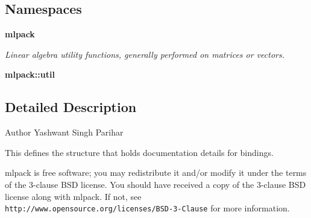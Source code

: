 \subsection*{Namespaces}
\begin{DoxyCompactItemize}
\item 
 \textbf{ mlpack}
\begin{DoxyCompactList}\small\item\em Linear algebra utility functions, generally performed on matrices or vectors. \end{DoxyCompactList}\item 
 \textbf{ mlpack\+::util}
\end{DoxyCompactItemize}


\subsection{Detailed Description}
\begin{DoxyAuthor}{Author}
Yashwant Singh Parihar
\end{DoxyAuthor}
This defines the structure that holds documentation details for bindings.

mlpack is free software; you may redistribute it and/or modify it under the terms of the 3-\/clause B\+SD license. You should have received a copy of the 3-\/clause B\+SD license along with mlpack. If not, see {\tt http\+://www.\+opensource.\+org/licenses/\+B\+S\+D-\/3-\/\+Clause} for more information. 